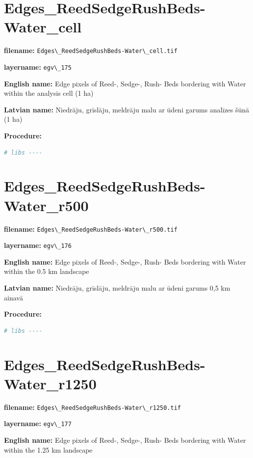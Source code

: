 \documentclass[
]{book}
\newcommand{\passthrough}[1]{#1}
\begin{document}
\section{Edges\_ReedSedgeRushBeds-Water\_cell}\label{ch06.175}

\textbf{filename:} \passthrough{\lstinline!Edges\_ReedSedgeRushBeds-Water\_cell.tif!}

\textbf{layername:} \passthrough{\lstinline!egv\_175!}

\textbf{English name:} Edge pixels of Reed-, Sedge-, Rush- Beds bordering with Water within the analysis cell (1 ha)

\textbf{Latvian name:} Niedrāju, grīslāju, meldrāju malu ar ūdeni garums analīzes šūnā (1 ha)

\textbf{Procedure:}

\begin{lstlisting}[language=R]
# libs ----
\end{lstlisting}

\section{Edges\_ReedSedgeRushBeds-Water\_r500}\label{ch06.176}

\textbf{filename:} \passthrough{\lstinline!Edges\_ReedSedgeRushBeds-Water\_r500.tif!}

\textbf{layername:} \passthrough{\lstinline!egv\_176!}

\textbf{English name:} Edge pixels of Reed-, Sedge-, Rush- Beds bordering with Water within the 0.5 km landscape

\textbf{Latvian name:} Niedrāju, grīslāju, meldrāju malu ar ūdeni garums 0,5 km ainavā

\textbf{Procedure:}

\begin{lstlisting}[language=R]
# libs ----
\end{lstlisting}

\section{Edges\_ReedSedgeRushBeds-Water\_r1250}\label{ch06.177}

\textbf{filename:} \passthrough{\lstinline!Edges\_ReedSedgeRushBeds-Water\_r1250.tif!}

\textbf{layername:} \passthrough{\lstinline!egv\_177!}

\textbf{English name:} Edge pixels of Reed-, Sedge-, Rush- Beds bordering with Water within the 1.25 km landscape
\end{document}
